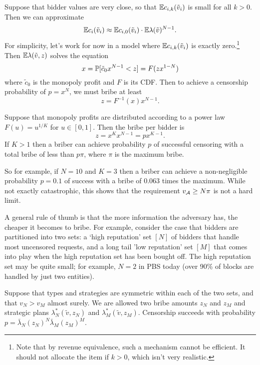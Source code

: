 \begin{example}

  Suppose that bidder values are very close, so that $\mathbb{E} c_{i,k}(\tilde v_i)$ is small for all $k>0$.
  Then we can approximate
  \[
    \mathbb{E} c_i(\tilde v_i) \approx \mathbb{E} c_{i,0}(\tilde v_i) \cdot \mathbb{E} \lambda(\tilde v)^{N-1}.
  \]
  For simplicity, let's work for now in a model where $\mathbb{E} c_{i,k}(\tilde v_i)$ is exactly zero.\footnote{Note that by revenue equivalence, such a mechanism cannot be efficient. It should not allocate the item if $k>0$, which isn't very realistic.}
  Then $\mathbb{E}\lambda(\tilde v,z)$ solves the equation
  \[
    x = \mathbb{P}[\tilde{c}_0x^{N-1} < z] = F(zx^{1-N})
  \]
  where $\tilde{c}_0$ is the monopoly profit and $F$ is its CDF.
  Then to achieve a censorship probability of $p=x^N$, we must bribe at least
  \[
    z = F^{-1}(x)x^{N-1}.
  \]
  
  Suppose that monopoly profits are distributed according to a power law $F(u) = u^{1/K}$ for $u\in[0,1]$.
  Then the bribe per bidder is
  \[
    z = x^Kx^{N-1} = px^{K-1}.
  \]
  If $K>1$ then a briber can achieve probability $p$ of successful censoring with a total bribe of less than $p\pi$, where $\pi$ is the maximum bribe.
  
  So for example, if $N=10$ and $K=3$ then a briber can achieve a non-negligible probability $p=0.1$ of success with a bribe of $0.063$ times the maximum.
  While not exactly catastrophic, this shows that the requirement $v_{\mathcal{A}}\geq N\pi$ is not a hard limit.

\end{example}

\begin{example}

  A general rule of thumb is that the more information the adversary has, the cheaper it becomes to bribe.
  For example, consider the case that bidders are partitioned into two sets: a `high reputation' set $[N]$ of bidders that handle most uncensored requests, and a long tail 'low reputation' set $[M]$ that comes into play when the high reputation set has been bought off.
  The high reputation set may be quite small; for example, $N=2$ in PBS today (over 90\% of blocks are handled by just two entities).

  Suppose that types and strategies are symmetric within each of the two sets, and that $v_N>v_M$ almost surely. 
  We are allowed two bribe amounts $z_N$ and $z_M$ and strategic plans $\lambda_N^*(\tilde{v},z_N)$ and $\lambda_M^*(\tilde{v},z_M)$.
  Censorship succeeds with probability $p=\bar\lambda_N(z_N)^N\bar\lambda_M(z_M)^M$.


\end{example}


